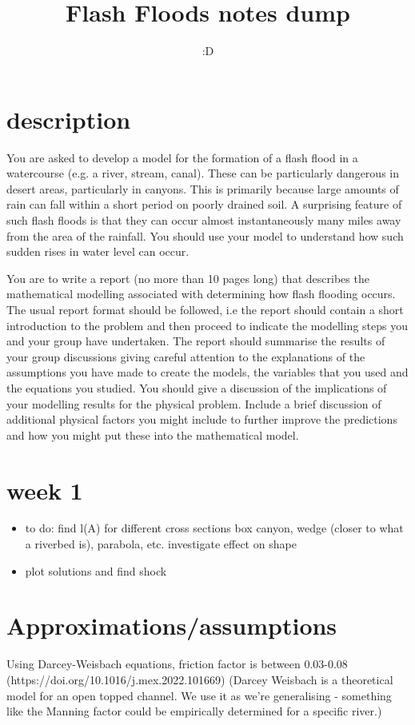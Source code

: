 \documentclass[12pt]{article}
\title{Flash Floods notes dump}
\author{:D}
\begin{document}
\maketitle
\section{description}
You are asked to develop a model for the formation of a flash flood in a watercourse (e.g.
a river, stream, canal). These can be particularly dangerous in desert areas, particularly in
canyons. This is primarily because large amounts of rain can fall within a short period on
poorly drained soil. A surprising feature of such flash floods is that they can occur almost
instantaneously many miles away from the area of the rainfall. You should use your model
to understand how such sudden rises in water level can occur.

You are to write a report (no more than 10 pages long) that describes the mathematical
modelling associated with determining how flash flooding occurs. The usual report format
should be followed, i.e the report should contain a short introduction to the problem and
then proceed to indicate the modelling steps you and your group have undertaken. The
report should summarise the results of your group discussions giving careful attention to the
explanations of the assumptions you have made to create the models, the variables that you
used and the equations you studied. You should give a discussion of the implications of your
modelling results for the physical problem. Include a brief discussion of additional physical
factors you might include to further improve the predictions and how you might put these
into the mathematical model.
\section{week 1}
\begin{itemize}
    \item to do: find l(A) for different cross sections
box canyon, wedge (closer to what a riverbed is), parabola, etc. investigate effect on shape
    \item plot solutions and find shock
\end{itemize}

\section{Approximations/assumptions}
Using Darcey-Weisbach equations, friction factor is between 0.03-0.08 (https://doi.org/10.1016/j.mex.2022.101669) (Darcey Weisbach is a theoretical model for an open topped channel. We use it as we're generalising - something like the Manning factor could be empirically determined for a specific river.)
\end{document}
